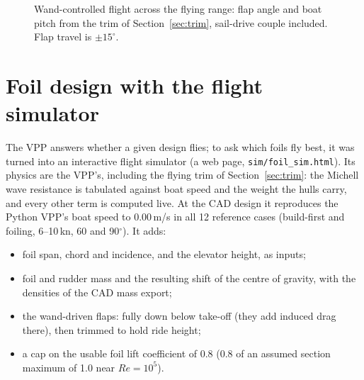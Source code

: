\documentclass[10pt,twocolumn]{article}
\begin{document}
\begin{figure}[t]
\centering
{}
\caption{Wand-controlled flight across the flying range: flap angle and boat pitch from the trim of Section~\ref{sec:trim}, sail-drive couple included. Flap travel is $\pm15^\circ$.}
\label{fig:rh}
\end{figure}

\section{Foil design with the flight simulator}\label{sec:opt}
The VPP answers whether a given design flies; to ask which foils fly best, it was turned into an interactive flight simulator (a web page, \texttt{sim/foil\_sim.html}). Its physics are the VPP's, including the flying trim of Section~\ref{sec:trim}: the Michell wave resistance is tabulated against boat speed and the weight the hulls carry, and every other term is computed live. At the CAD design it reproduces the Python VPP's boat speed to 0.00\,m/s in all 12 reference cases (build-first and foiling, 6--10\,kn, 60 and 90$^\circ$). It adds:
\begin{itemize}\itemsep1pt
\item foil span, chord and incidence, and the elevator height, as inputs;
\item foil and rudder mass and the resulting shift of the centre of gravity, with the densities of the CAD mass export;
\item the wand-driven flaps: fully down below take-off (they add induced drag there), then trimmed to hold ride height;
\item a cap on the usable foil lift coefficient of 0.8 (0.8 of an assumed section maximum of 1.0 near $Re=10^5$).
\end{itemize}
\end{document}
